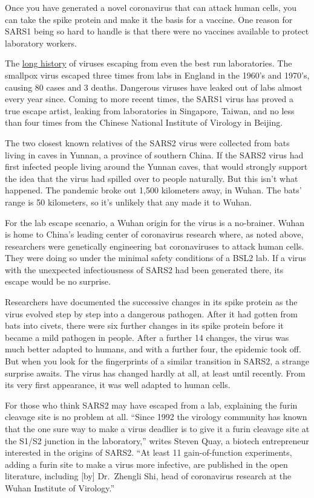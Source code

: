 \documentclass[
]{book}
\begin{document}
Once you have generated a novel coronavirus that can attack human cells, you can take the spike protein and make it the basis for a vaccine.
One reason for SARS1 being so hard to handle is that there were no vaccines available to protect laboratory workers.

The \href{https://armscontrolcenter.org/wp-content/uploads/2016/02/Escaped-Viruses-final-2-17-14-copy.pdf}{long history} of viruses escaping from even the best run laboratories. The smallpox virus escaped three times from labs in England in the 1960's and 1970's, causing 80 cases and 3 deaths. Dangerous viruses have leaked out of labs almost every year since. Coming to more recent times, the SARS1 virus has proved a true escape artist, leaking from laboratories in Singapore, Taiwan, and no less than four times from the Chinese National Institute of Virology in Beijing.

The two closest known relatives of the SARS2 virus were collected from bats living in caves in Yunnan, a province of southern China. If the SARS2 virus had first infected people living around the Yunnan caves, that would strongly support the idea that the virus had spilled over to people naturally. But this isn't what happened. The pandemic broke out 1,500 kilometers away, in Wuhan.
The bats' range is 50 kilometers, so it's unlikely that any made it to Wuhan.

For the lab escape scenario, a Wuhan origin for the virus is a no-brainer. Wuhan is home to China's leading center of coronavirus research where, as noted above, researchers were genetically engineering bat coronaviruses to attack human cells. They were doing so under the minimal safety conditions of a BSL2 lab. If a virus with the unexpected infectiousness of SARS2 had been generated there, its escape would be no surprise.

Researchers have documented the successive changes in its spike protein as the virus evolved step by step into a dangerous pathogen. After it had gotten from bats into civets, there were six further changes in its spike protein before it became a mild pathogen in people. After a further 14 changes, the virus was much better adapted to humans, and with a further four, the epidemic took off.
But when you look for the fingerprints of a similar transition in SARS2, a strange surprise awaits. The virus has changed hardly at all, at least until recently. From its very first appearance, it was well adapted to human cells.

For those who think SARS2 may have escaped from a lab, explaining the furin cleavage site is no problem at all. ``Since 1992 the virology community has known that the one sure way to make a virus deadlier is to give it a furin cleavage site at the S1/S2 junction in the laboratory,'' writes Steven Quay, a biotech entrepreneur interested in the origins of SARS2. ``At least 11 gain-of-function experiments, adding a furin site to make a virus more infective, are published in the open literature, including {[}by{]} Dr.~Zhengli Shi, head of coronavirus research at the Wuhan Institute of Virology.''
\end{document}
